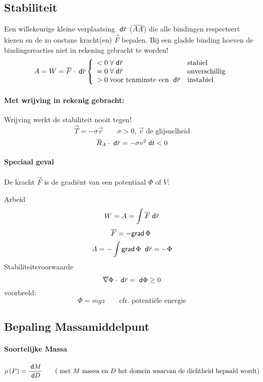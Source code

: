 \subsection{Stabiliteit}
\label{sec:Stabiliteit}
Een willekeurige kleine verplaatsing $\;\textsf{d}\overline{r}$ ($\overline{AA\acute{}}$) die alle bindingen respecteert kiezen en de zo onstane kracht(en) $\vec{F}$ bepalen. Bij een gladde binding hoeven de bindingsreacties niet in rekening gebracht te worden!
\[
  A = W = \overline{F} \cdot \;\textsf{d}\overline{r} 
  \left\{
    \begin{array}{ll}
      < 0 \; \forall \;\textsf{d}\overline{r} & \mbox{stabiel}\\
      = 0 \; \forall \;\textsf{d}\overline{r} & \mbox{onverschillig}\\
      > 0 \; \mbox{voor tenminste een } \;\textsf{d}\overline{r} & \mbox{instabiel}\\
    \end{array}
  \right.
\]
\paragraph{Met wrijving in rekenig gebracht:} Wrijving werkt de stabiliteit nooit tegen!
\[
  \vec{T} = -\sigma \vec{v} \qquad \mbox{$\sigma > 0$, $\vec{v}$ de glijsnelheid}
\]
\[
  \overline{R}_A \cdot \;\textsf{d}\overline{r} = - \sigma v^2 \;\textsf{d}t < 0
\]

\paragraph{Speciaal geval} De kracht $\vec{F}$ is de gradiënt van een potentiaal $\Phi$ of $V$:\par
Arbeid
\[
  W = A = \int \overline{F} \;\textsf{d}\overline{r}
\]
\[
  \overline{F} = - \textsf{grad}\,\Phi\;
\]
\[
  A = - \int \textsf{grad}\,\Phi\; \;\textsf{d}\overline{r} = - \Phi
\]
Stabiliteitsvoorwaarde
\[
  \overline{\nabla} \Phi \cdot \;\textsf{d}\overline{r} = \;\textsf{d}\Phi \geq 0
\]
voorbeeld:
\[
  \Phi = mgz \qquad \mbox{cfr. potentiële energie}
\] 
   
\subsection{Bepaling Massamiddelpunt}
\label{sec:BepalingMassamiddelpunt}
    \paragraph{Soortelijke Massa}
    \label{sec:SoortelijkeMassa}
      \[
        \rho\left(P\right) = \frac{\;\textsf{d}M}{\;\textsf{d}D} \qquad \mbox{( met $M$ massa en $D$ het domein waarvan de dichtheid bepaald wordt)}
      \]
